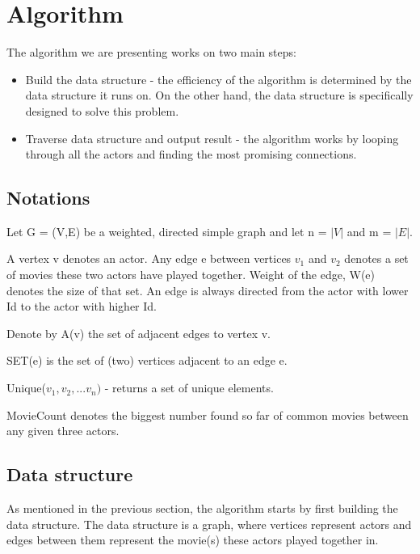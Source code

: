 \label{Algorithm}
\section{Algorithm}

The algorithm we are presenting works on two main steps:
\begin{itemize}
  \item Build the data structure - the efficiency of the algorithm is determined by the data structure it runs on. On the other hand, the data structure is specifically designed to solve this problem.
  \item Traverse data structure and output result - the algorithm works by looping through all the actors and finding the most promising connections.
\end{itemize} 

\subsection{Notations}
Let G = (V,E) be a weighted, directed simple graph and let n = \(\lvert V\rvert\) and m = \(\lvert E\rvert\).

A vertex v denotes an actor. Any edge e between vertices \(v_1\) and \(v_2\) denotes a set of movies these two actors have played together. Weight of the edge, W(e) denotes the size of that set. An edge is always directed from the actor with lower Id to the actor with higher Id.

Denote by A(v) the set of adjacent edges to vertex v.

SET(e) is the set of (two) vertices adjacent to an edge e.

Unique(\(v_1, v_2,... v_n)\) - returns a set of unique elements.

MovieCount denotes the biggest number found so far of common movies between any given three actors.

\subsection{Data structure}
As mentioned in the previous section, the algorithm starts by first building the data structure. The data structure is a graph, where vertices represent actors and edges between them represent the movie(s) these actors played together in. 

